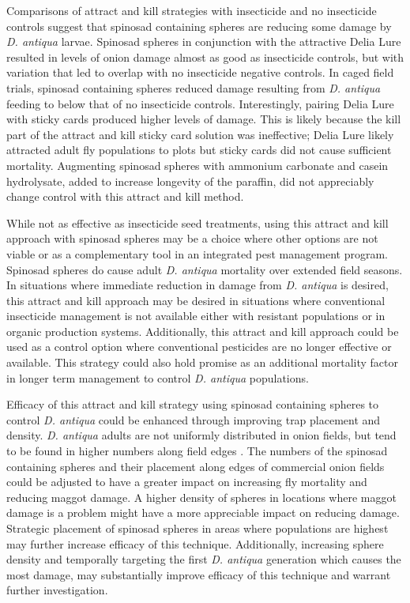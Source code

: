 \documentclass[alpha-refs]{wiley-article}
\begin{document}
Comparisons of attract and kill strategies with insecticide and no insecticide controls suggest that spinosad containing spheres are reducing some damage by \textit{D. antiqua} larvae.  Spinosad spheres in conjunction with the attractive Delia Lure resulted in levels of onion damage almost as good as insecticide controls, but with variation that led to overlap with no insecticide negative controls.  In caged field trials, spinosad containing spheres reduced damage resulting from \textit{D. antiqua} feeding to below that of no insecticide controls.  Interestingly, pairing Delia Lure with sticky cards produced higher levels of damage.  This is likely because the kill part of the attract and kill sticky card solution was ineffective; Delia Lure likely attracted adult fly populations to plots but sticky cards did not cause sufficient mortality.  Augmenting spinosad spheres with ammonium carbonate and casein hydrolysate, added to increase longevity of the paraffin,  did not appreciably change control with this attract and kill method.  

While not as effective as insecticide seed treatments, using this attract and kill approach with spinosad spheres may be a choice where other options are not viable or as a complementary tool in an integrated pest management program.  Spinosad spheres do cause adult \textit{D. antiqua} mortality over extended field seasons.  In situations where immediate reduction in damage from \textit{D. antiqua} is desired, this attract and kill approach may be desired in situations where conventional insecticide management is not available either with resistant populations or in organic production systems.  Additionally, this attract and kill approach could be used as a control option where conventional pesticides are no longer effective or available. This strategy could also hold promise as an additional mortality factor in longer term management to control \textit{D. antiqua} populations.  

Efficacy of this attract and kill strategy using spinosad containing spheres to control \textit{D. antiqua} could be enhanced through improving trap placement and density.  \textit{D. antiqua} adults are not uniformly distributed in onion fields, but tend to be found in higher numbers along field edges \citep{werling2006spatial}.  The numbers of the spinosad containing spheres and their placement along edges of commercial onion fields could be adjusted to have a greater impact on increasing fly mortality and reducing maggot damage.  A higher density of spheres in locations where maggot damage is a problem might have a more appreciable impact on reducing damage. Strategic placement of spinosad spheres in areas where populations are highest may further increase efficacy of this technique.  Additionally, increasing sphere density and temporally targeting the first \textit{D. antiqua} generation which causes the most damage, may substantially improve efficacy of this technique and warrant further investigation.  
\end{document}
